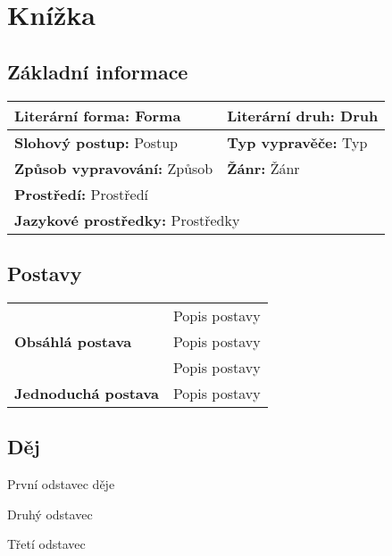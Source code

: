 \section{Knížka}
\subsection*{Základní informace}
\begin{tabular}{l|l}
    \textbf{Literární forma:} Forma     & \textbf{Literární druh:} Druh \\
    \hline
    \textbf{Slohový postup:} Postup     & \textbf{Typ vypravěče:} Typ   \\
    \hline
    \textbf{Způsob vypravování:} Způsob & \textbf{Žánr:} Žánr           \\
    \hline
    \multicolumn{2}{l}{\textbf{Prostředí:} Prostředí}                   \\
    \hline
    \multicolumn{2}{l}{\textbf{Jazykové prostředky:} Prostředky}        \\
\end{tabular}
\subsection*{Postavy}
\begin{tabular}{l|l}
    \multirow{3}{15em}{\textbf{Obsáhlá postava}} & Popis postavy \\
                                                 & Popis postavy \\
                                                 & Popis postavy \\
    \hline
    \textbf{Jednoduchá postava}                  & Popis postavy \\
\end{tabular}
\subsection*{Děj}
První odstavec děje

Druhý odstavec

Třetí odstavec
